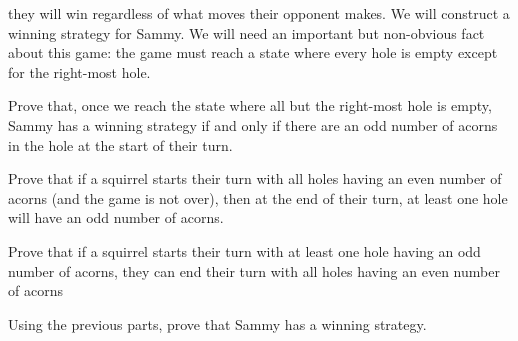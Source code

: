 \documentclass[12pt]{exam}
\begin{document}
they will win regardless of what moves their opponent makes. We will construct
a winning strategy for Sammy. We will need an important but non-obvious fact
about this game: the game must reach a state where every hole is
empty except for the right-most hole.
\begin{qparts}
\item Prove that, once we reach the state where all but the right-most hole is
empty,
Sammy has a winning strategy if and only if there are an odd number of acorns
in the hole at the start of their turn.
\item Prove that if a squirrel starts their turn with all holes having an even
number
of acorns (and the game is not over), then at the end of their turn,
at least one hole will have an odd number of acorns.
\item Prove that if a squirrel starts their turn with at least one hole having
an odd number of acorns,
they can end their turn with all holes having an even number of acorns
\item Using the previous parts, prove that Sammy has a winning strategy.
\end{qparts}
\end{document}
